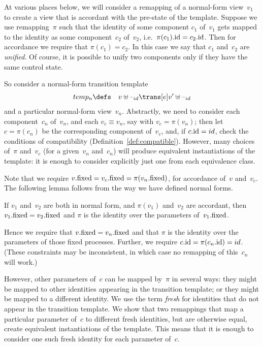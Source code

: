 At various places below, we will consider a remapping of a normal-form
view~$v_1$ to create a view that is accordant with the pre-state of the
template.  Suppose we use remapping~$\pi$ such that the identity of some
component $c_1$ of~$v_1$ gets mapped to the identity as some component~$c_2$
of~$v_2$, i.e.~$\pi(c_1).\mathrm{id} = c_2.\mathrm{id}$.  Then for accordance we require that
$\pi(c_1) = c_2$.  In this case we say that $c_1$ and~$c_2$ are
\emph{unified}.  Of course, it is possible to unify two components only if
they have the same control state.

So consider a normal-form transition template
\begin{eqnarray*}
temp_n & \defs &  v \uplus \hole{id} \trans[e] v' \uplus \hole{id}
\end{eqnarray*}
and a particular normal-form view~$v_n$.  
%
Abstractly, we need to consider each component~$c_n$ of~$v_n$, and each $v_c
\equiv v_n$, say with $v_c = \pi(v_n)$; then let $c = \pi(c_n)$ be the
corresponding component of~$v_c$, and, if $c.\mathrm{id} = id$, check the conditions
of compatibility (Definition~\ref{def:compatible}).  However, many choices
of~$\pi$ and~$v_c$ (for a given~$v_n$ and~$c_n$) will produce equivalent
instantiations of the template: it is enough to consider explicitly just one
from each equivalence class.

Note that we require $v.\mathrm{fixed} = v_c.\mathrm{fixed} = \pi(v_n.\mathrm{fixed})$, for accordance
of~$v$ and~$v_c$.  The following lemma follows from the way we have defined
normal forms.
%
\begin{lemma}
\label{lem:remapping-id-on-fixed-params}
If $v_1$ and~$v_2$ are both in normal form, and $\pi(v_1)$ and~$v_2$ are
accordant, then $v_1.\mathrm{fixed} = v_2.\mathrm{fixed}$ and $\pi$ is the identity over the
parameters of~$v_1.\mathrm{fixed}$.
\end{lemma}
%
Hence we require that $v.\mathrm{fixed} = v_n.\mathrm{fixed}$ and that $\pi$ is the identity
over the parameters of those fixed processes.  Further, we require $c.\mathrm{id} =
\pi(c_n.\mathrm{id}) = id$.  (These constraints may be inconsistent, in which case no
remapping of this~$c_n$ will work.)

However, other parameters of~$c$ can be mapped by~$\pi$ in several
ways: they might be mapped to other identities appearing in the transition
template; or they might be mapped to a different identity.  We use the term
\emph{fresh} for identities that do not appear in the transition template.  We
show that two remappings that map a particular parameter of~$c$ to different
fresh identities, but are otherwise equal, create equivalent instantiations of
the template.  This means that it is enough to consider one such fresh
identity for each parameter of~$c$. 


